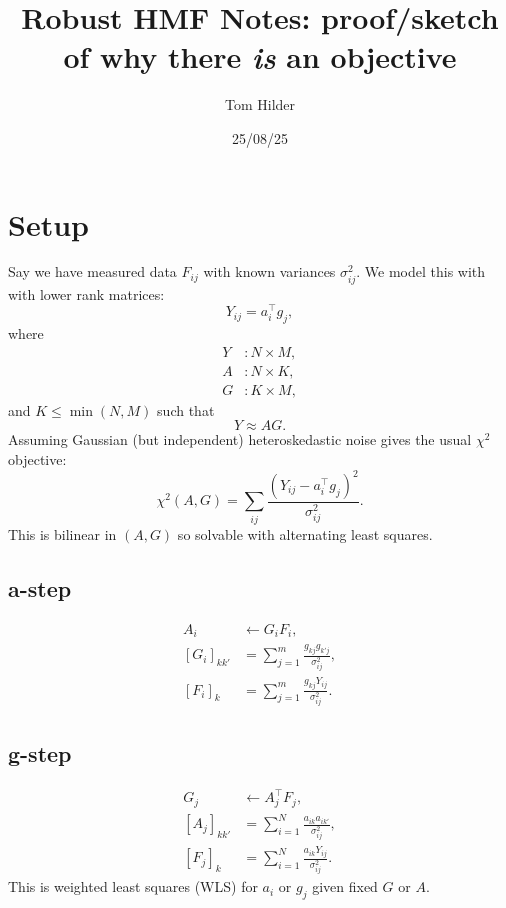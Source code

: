 \documentclass[11pt]{article}
\title{Robust HMF Notes: proof/sketch of why there \emph{is} an objective}
\author{Tom Hilder}
\date{25/08/25}
\begin{document}
\maketitle

\section*{Setup}

Say we have measured data $F_{ij}$ with known variances $\sigma_{ij}^2$. 
We model this with with lower rank matrices:
\begin{equation}
    Y_{ij} = a_i^\top g_j,
\end{equation}
where
\begin{align*}
    Y &: N \times M, \\
    A &: N \times K, \\
    G &: K \times M,
\end{align*}
and $K \leq \min(N, M)$ such that
\begin{equation}
    Y \approx AG.
\end{equation}
Assuming Gaussian (but independent) heteroskedastic noise gives the usual $\chi^2$ objective:
\begin{equation}
    \chi^2(A,G) = \sum_{ij} \frac{(Y_{ij} - a_i^\top g_j)^2}{\sigma_{ij}^2}.
\end{equation}
This is bilinear in $(A,G)$ so solvable with alternating least squares.

\subsection*{a-step}
\begin{align*}
    A_i &\leftarrow G_i F_i, \\
    [G_i]_{kk'} &= \sum_{j=1}^m \frac{g_{kj} g_{k'j}}{\sigma_{ij}^2}, \\
    [F_i]_k &= \sum_{j=1}^m \frac{g_{kj} Y_{ij}}{\sigma_{ij}^2}.
\end{align*}
\subsection*{g-step}
\begin{align*}
    G_j &\leftarrow A_j^\top F_j, \\
    [A_j]_{kk'} &= \sum_{i=1}^N \frac{a_{ik} a_{ik'}}{\sigma_{ij}^2}, \\
    [F_j]_k &= \sum_{i=1}^N \frac{a_{ik} Y_{ij}}{\sigma_{ij}^2}.
\end{align*}
This is weighted least squares (WLS) for $a_i$ or $g_j$ given fixed $G$ or $A$.
\end{document}
